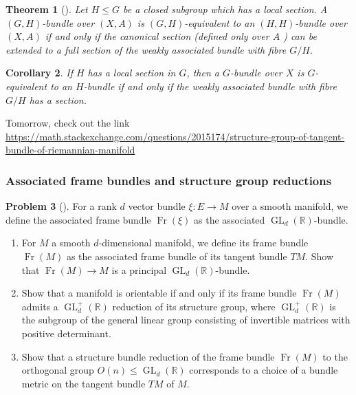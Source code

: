 \documentclass[reqno]{amsart}
\newtheorem{theorem}{Theorem}[section]
\newtheorem{corollary}[theorem]{Corollary}
\theoremstyle{definition}
\newtheorem{problem}[theorem]{Problem}
\theoremstyle{remark}
\DeclareMathOperator{\GL}{GL}
\DeclareMathOperator{\Fr}{Fr}
\begin{document}
    \begin{theorem}[]
        Let $H \le G$ be a closed subgroup which
        has a local section. 
        A $\left( G,H \right) $-bundle over
        $\left( X,A \right) $ is
        $(G,H)$-equivalent to an
        $\left( H,H \right) $-bundle over
        $\left( X,A \right) $ if and only if the 
        canonical section (defined only over $A$ ) can
        be extended to a full section of the
        weakly associated bundle with fibre
        $G /H$.
    \end{theorem}

    \begin{corollary}
        If $H$ has a local section in $G$, then
        a $G$-bundle over $X$ is $G$-equivalent to an
        $H$-bundle if and only if the weakly associated
        bundle with fibre $G /H$ has a section.
    \end{corollary}


    Tomorrow, check out the link
    \url{https://math.stackexchange.com/questions/2015174/structure-group-of-tangent-bundle-of-riemannian-manifold}

    \subsubsection{Associated frame bundles and structure
    group reductions}


    \begin{problem}[]
    For a rank $d$ vector bundle
    $\xi \colon E \to M$ over a smooth manifold, we 
    define the associated frame bundle $\Fr \left( \xi \right) $ 
    as the associated $\GL_d \left( \mathbb{R} \right) $-bundle.
        \begin{enumerate}
            \item For $M$ a smooth $d$-dimensional
                manifold, we define its frame
                bundle $\Fr (M)$ as the associated
                frame bundle of its tangent bundle
                $TM$. Show that
                $\Fr(M) \to M$ is a principal 
                $\GL_d \left( \mathbb{R} \right) $-bundle.
            \item Show that a manifold is
                orientable if and only if its
                frame bundle $\Fr (M)$ admits a
                $\GL_d^{+} (\mathbb{R})$ reduction of
                its structure group, where
                $\GL_d^{+}(\mathbb{R})$ is the subgroup
                of the general linear group consisting
                of invertible matrices with positive determinant.
            \item Show that a structure bundle reduction of
                the frame bundle
                $\Fr(M)$ to the orthogonal group
                $O(n) \le \GL_d(\mathbb{R})$ corresponds
                to a choice of a bundle metric on the tangent
                bundle  $TM$ of $M$.
        \end{enumerate}
    \end{problem}
\end{document}
